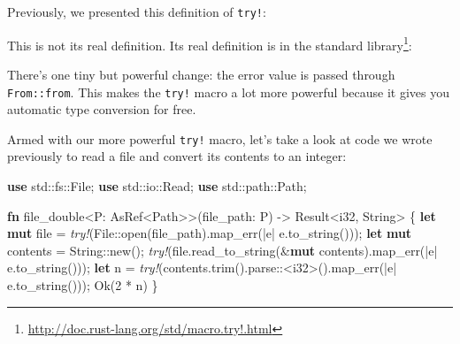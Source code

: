 \documentclass[a4paper,]{book}
\renewcommand*{\hypertarget}[3][\ar]{%
  \def\ar{#2}%
  \label{#1}%
  #3}
\newenvironment{Shaded}{\begin{snugshade}}{\end{snugshade}}
\newcommand{\KeywordTok}[1]{\textcolor[rgb]{0.13,0.29,0.53}{\textbf{{#1}}}}
\newcommand{\DataTypeTok}[1]{\textcolor[rgb]{0.13,0.29,0.53}{{#1}}}
\newcommand{\DecValTok}[1]{\textcolor[rgb]{0.00,0.00,0.81}{{#1}}}
\newcommand{\ConstantTok}[1]{\textcolor[rgb]{0.00,0.00,0.00}{{#1}}}
\newcommand{\PreprocessorTok}[1]{\textcolor[rgb]{0.56,0.35,0.01}{\textit{{#1}}}}
\newcommand{\NormalTok}[1]{{#1}}
\renewcommand{\href}[2]{#2\footnote{\url{#1}}}
\begin{document}
Previously, we presented this definition of \texttt{try!}:

\begin{Shaded}
\end{Shaded}

This is not its real definition. Its real definition is
\href{http://doc.rust-lang.org/std/macro.try!.html}{in the standard
library}:

\protect\hypertarget{code-try-def}{}{}

\begin{Shaded}
\end{Shaded}

There's one tiny but powerful change: the error value is passed through
\texttt{From::from}. This makes the \texttt{try!} macro a lot more
powerful because it gives you automatic type conversion for free.

Armed with our more powerful \texttt{try!} macro, let's take a look at
code we wrote previously to read a file and convert its contents to an
integer:

\begin{Shaded}
\begin{Highlighting}[]
\KeywordTok{use} \NormalTok{std::fs::File;}
\KeywordTok{use} \NormalTok{std::io::Read;}
\KeywordTok{use} \NormalTok{std::path::Path;}

\KeywordTok{fn} \NormalTok{file_double<P: AsRef<Path>>(file_path: P) -> }\DataTypeTok{Result}\NormalTok{<}\DataTypeTok{i32}\NormalTok{, }\DataTypeTok{String}\NormalTok{> \{}
    \KeywordTok{let} \KeywordTok{mut} \NormalTok{file = }\PreprocessorTok{try!}\NormalTok{(File::open(file_path).map_err(|e| e.to_string()));}
    \KeywordTok{let} \KeywordTok{mut} \NormalTok{contents = }\DataTypeTok{String}\NormalTok{::new();}
    \PreprocessorTok{try!}\NormalTok{(file.read_to_string(&}\KeywordTok{mut} \NormalTok{contents).map_err(|e| e.to_string()));}
    \KeywordTok{let} \NormalTok{n = }\PreprocessorTok{try!}\NormalTok{(contents.trim().parse::<}\DataTypeTok{i32}\NormalTok{>().map_err(|e| e.to_string()));}
    \ConstantTok{Ok}\NormalTok{(}\DecValTok{2} \NormalTok{* n)}
\NormalTok{\}}
\end{Highlighting}
\end{Shaded}
\end{document}
